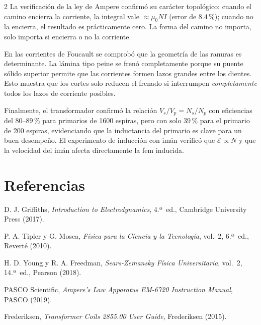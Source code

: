 \documentclass[10pt]{article}
\begin{document}
\begin{multicols}{2}
La verificación de la ley de Ampere confirmó su carácter topológico: cuando el camino encierra la corriente, la integral vale $\approx\mu_0 NI$ (error de $8.4\,\%$); cuando no la encierra, el resultado es prácticamente cero. La forma del camino no importa, solo importa si encierra o no la corriente.

En las corrientes de Foucault se comprobó que la geometría de las ranuras es determinante. La lámina tipo peine se frenó completamente porque su puente sólido superior permite que las corrientes formen lazos grandes entre los dientes. Esto muestra que los cortes solo reducen el frenado si interrumpen \emph{completamente} todos los lazos de corriente posibles.

Finalmente, el transformador confirmó la relación $V_s/V_p = N_s/N_p$ con eficiencias del $80$--$89\,\%$ para primarios de 1600 espiras, pero con solo $39\,\%$ para el primario de 200 espiras, evidenciando que la inductancia del primario es clave para un buen desempeño. El experimento de inducción con imán verificó que $\mathcal{E} \propto N$ y que la velocidad del imán afecta directamente la fem inducida.

\section{Referencias}

\noindent [1] D. J. Griffiths, \textit{Introduction to Electrodynamics}, 4.ª~ed., Cambridge University Press (2017).

\noindent [2] P. A. Tipler y G. Mosca, \textit{Física para la Ciencia y la Tecnología}, vol.~2, 6.ª~ed., Reverté (2010).

\noindent [3] H. D. Young y R. A. Freedman, \textit{Sears-Zemansky Física Universitaria}, vol.~2, 14.ª~ed., Pearson (2018).

\noindent [4] PASCO Scientific, \textit{Ampere's Law Apparatus EM-6720 Instruction Manual}, PASCO (2019).

\noindent [5] Frederiksen, \textit{Transformer Coils 2855.00 User Guide}, Frederiksen (2015).

\end{multicols}
\end{document}
